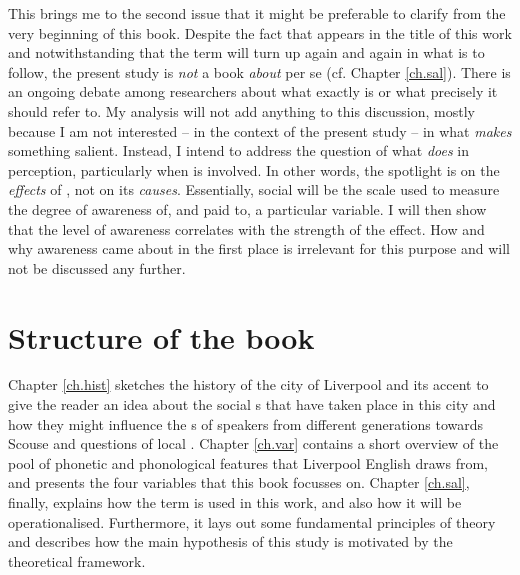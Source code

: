 This brings me to the second issue that it might be preferable to clarify from the very beginning of this book.
Despite the fact that \emph{} appears in the title of this work and notwithstanding that the term will turn up again and again in what is to follow, the present study is \emph{not} a book \emph{about}  per se (cf. Chapter \ref{ch.sal}).
There is an ongoing debate among researchers about what exactly  is or what precisely it should refer to.
My analysis will not add anything to this discussion, mostly because I am not interested -- in the context of the present study -- in what \emph{makes} something salient.
Instead, I intend to address the question of what  \emph{does} in perception, particularly when  is involved.
In other words, the spotlight is on the \emph{effects} of , not on its \emph{causes}.
Essentially, social  will be the scale used to measure the degree of awareness of, and  paid to, a particular variable.
I will then show that the level of awareness correlates with the strength of the  effect.
How and why awareness came about in the first place is irrelevant for this purpose and will not be discussed any further.

\section{Structure of the book}
\label{sec.intro.structure}

Chapter \ref{ch.hist} sketches the history of the city of Liverpool and its accent to give the reader an idea about the social s that have taken place in this city and how they might influence the s of speakers from different generations towards Scouse and questions of local .
Chapter \ref{ch.var} contains a short overview of the pool of phonetic and phonological features that Liverpool English draws from, and presents the four variables that this book focusses on.
Chapter \ref{ch.sal}, finally, explains how the term \emph{} is used in this work, and also how it will be operationalised.
Furthermore, it lays out some fundamental principles of  theory and describes how the main hypothesis of this study is motivated by the theoretical framework.

